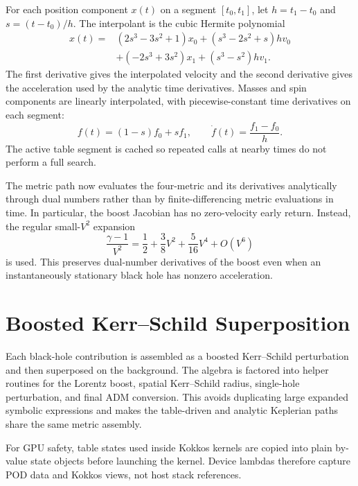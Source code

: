 \documentclass[11pt]{article}
\begin{document}
For each position component \(x(t)\) on a segment
\([t_0,t_1]\), let \(h=t_1-t_0\) and
\(s=(t-t_0)/h\).  The interpolant is the cubic Hermite polynomial
\begin{equation}
\begin{split}
  x(t) ={}&
  (2s^3-3s^2+1)x_0
  +(s^3-2s^2+s)h v_0\\
  &+(-2s^3+3s^2)x_1
  +(s^3-s^2)h v_1 .
\end{split}
\end{equation}
The first derivative gives the interpolated velocity and the second
derivative gives the acceleration used by the analytic time derivatives.
Masses and spin components are linearly interpolated, with piecewise-constant
time derivatives on each segment:
\begin{equation}
  f(t) = (1-s)f_0 + s f_1,
  \qquad
  \dot f(t) = \frac{f_1-f_0}{h}.
\end{equation}
The active table segment is cached so repeated calls at nearby times do not
perform a full search.

The metric path now evaluates the four-metric and its derivatives
analytically through dual numbers rather than by finite-differencing metric
evaluations in time.  In particular, the boost Jacobian has no zero-velocity
early return.  Instead, the regular small-\(V^2\) expansion
\begin{equation}
  \frac{\gamma - 1}{V^2}
  =
  \frac{1}{2}
  +\frac{3}{8}V^2
  +\frac{5}{16}V^4
  +O(V^6)
\end{equation}
is used.  This preserves dual-number derivatives of the boost even when an
instantaneously stationary black hole has nonzero acceleration.

\section{Boosted Kerr--Schild Superposition}

Each black-hole contribution is assembled as a boosted Kerr--Schild
perturbation and then superposed on the background.  The algebra is factored
into helper routines for the Lorentz boost, spatial Kerr--Schild radius,
single-hole perturbation, and final ADM conversion.  This avoids duplicating
large expanded symbolic expressions and makes the table-driven and analytic
Keplerian paths share the same metric assembly.

For GPU safety, table states used inside Kokkos kernels are copied into
plain by-value state objects before launching the kernel.  Device lambdas
therefore capture POD data and Kokkos views, not host stack references.
\end{document}
